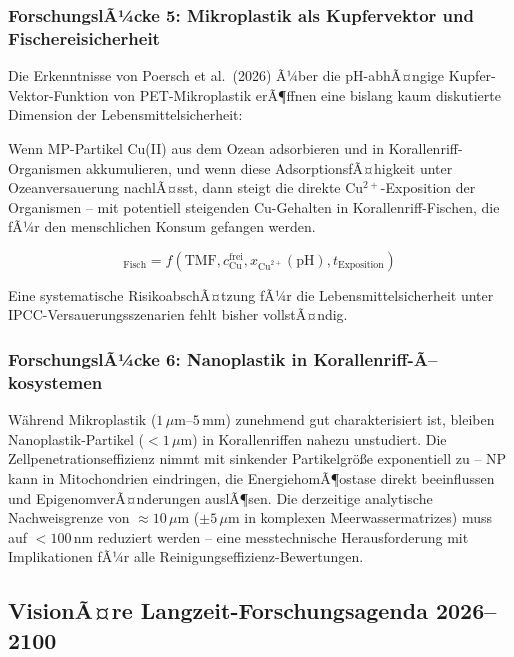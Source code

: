 ﻿\documentclass[12pt,a4paper]{article}
\theoremstyle{definition}
\theoremstyle{remark}
\newcommand{\MP}{Mikroplastik}
\begin{document}
\subsubsection{ForschungslÃ¼cke 5: Mikroplastik als Kupfervektor und Fischereisicherheit}

Die Erkenntnisse von Poersch et al.\ (2026) Ã¼ber die pH-abhÃ¤ngige
Kupfer-Vektor-Funktion von PET-Mikroplastik erÃ¶ffnen eine bislang kaum
diskutierte Dimension der Lebensmittelsicherheit:

Wenn MP-Partikel Cu(II) aus dem Ozean adsorbieren und in Korallenriff-Organismen
akkumulieren, und wenn diese AdsorptionsfÃ¤higkeit unter Ozeanversauerung nachlÃ¤sst,
dann steigt die direkte Cu$^{2+}$-Exposition der Organismen -- mit potentiell
steigenden Cu-Gehalten in Korallenriff-Fischen, die fÃ¼r den menschlichen
Konsum gefangen werden.

\begin{equation}
  [\text{Cu}]_{\text{Fisch}} = f(\text{TMF}, c_{\text{Cu}}^{\text{frei}},
  x_{\text{Cu}^{2+}}(\text{pH}), t_{\text{Exposition}})
  \label{eq:fish_cu_accumulation}
\end{equation}

Eine systematische RisikoabschÃ¤tzung fÃ¼r die Lebensmittelsicherheit unter
IPCC-Versau\-erungsszenarien fehlt bisher vollstÃ¤ndig.

\subsubsection{ForschungslÃ¼cke 6: Nanoplastik in Korallenriff-Ã–kosystemen}

W\"ahrend \MP{} ($1\,\mu$m--$5$\,mm) zunehmend gut charakterisiert ist,
bleiben Nanoplastik-Partikel ($< 1\,\mu$m) in Korallenriffen nahezu
unstudiert. Die Zellpenetrationseffizienz nimmt mit sinkender Partikelgr\"o\ss{}e
exponentiell zu -- NP kann in Mitochondrien eindringen, die EnergiehomÃ¶ostase
direkt beeinflussen und EpigenomverÃ¤nderungen auslÃ¶sen.
Die derzeitige analytische Nachweisgrenze von $\approx 10\,\mu$m
($\pm 5\,\mu$m in komplexen Meerwassermatrizes) muss auf $< 100$\,nm
reduziert werden -- eine messtechnische Herausforderung mit Implikationen
fÃ¼r alle Reinigungseffizienz-Bewertungen.

\subsection{VisionÃ¤re Langzeit-Forschungsagenda 2026--2100}
\label{subsec:forschungsagenda_2100}
\end{document}
